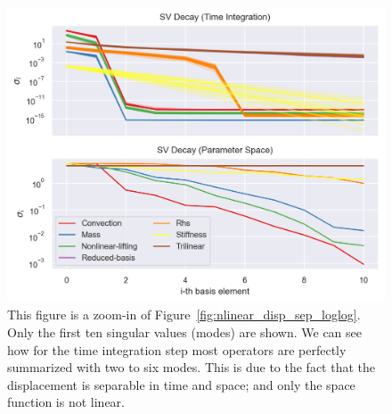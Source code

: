\documentclass[../../thesis.tex]{subfiles}
\begin{document}
\begin{figure}[h]
    \includegraphics[width =\columnwidth]{research_project/piston/figures/nonlinear_displacement/separable/sigmas_logy.png}
    \caption{This figure is a zoom-in of Figure~\ref{fig:nlinear_disp_sep_loglog}.
    Only the first ten singular values (modes) are shown.
    We can see how for the time integration step most operators 
    are perfectly summarized with two to six modes.
    This is due to the fact that the displacement is separable in time and space;
    and only the space function is not linear.}
    \label{fig:nlinear_disp_sep_logy}
\end{figure}
\end{document}
